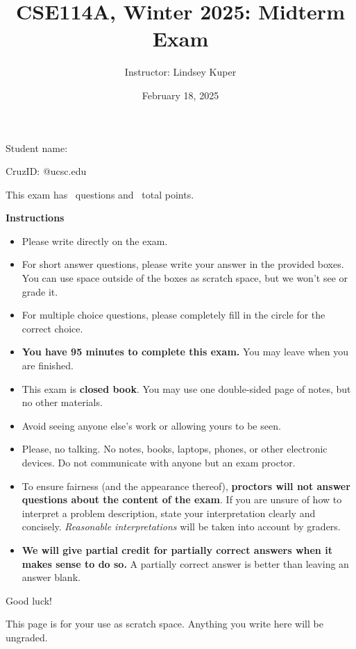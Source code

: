\documentclass[addpoints]{exam}
\title{CSE114A, Winter 2025: Midterm Exam}
\author{Instructor: Lindsey Kuper}
\date{February 18, 2025}
\begin{document}
\maketitle

\begin{coverpages}

\bigskip  

\noindent Student name: \hrulefill

\bigskip
\bigskip

\noindent CruzID: \hrulefill @ucsc.edu

\bigskip
\bigskip

\noindent This exam has \numquestions~questions and \numpoints~total points.

\bigskip
\bigskip

\noindent \textbf{Instructions}

\begin{itemize}
\item Please write directly on the exam.
\item For short answer questions, please write your answer in the provided boxes.  You can use space outside of the boxes as scratch space, but we won't see or grade it.
\item For multiple choice questions, please completely fill in the circle for the correct choice.
\item \textbf{You have 95 minutes to complete this exam.} You may leave when you are finished.
\item This exam is \textbf{closed book}.  You may use one double-sided page of notes, but no other materials.
\item Avoid seeing anyone else's work or allowing yours to be seen.
\item Please, no talking.  No notes, books, laptops, phones, or other electronic devices. Do not communicate with anyone but an exam proctor.
\item To ensure fairness (and the appearance thereof),
  \textbf{proctors will not answer questions about the content of the exam}. If you are unsure 
  of how to interpret a problem description, state your interpretation clearly and concisely. 
  \textit{Reasonable interpretations} will be taken into account by graders.
\item \textbf{We will give partial credit for partially correct answers when it makes sense to do so.} A partially correct answer is better than leaving an answer blank.
\end{itemize}
  
\bigskip

\noindent Good luck!

\newpage

This page is for your use as scratch space. Anything you write here will be ungraded.

\newpage  

\end{coverpages}
\end{document}
